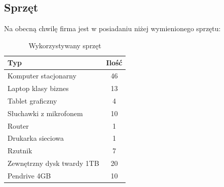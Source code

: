 \documentclass{article}
\begin{document}
        \subsection{Sprzęt}
            Na obecną chwilę firma jest w posiadaniu niżej wymienionego sprzętu:
            \begin{table}[H]
                \centering
                \begin{tabular}{ | l | c | }
                    \hline
                    \textbf{Typ} & \textbf{Ilość} \\
                    \hline
                    Komputer stacjonarny & 46 \\
                    \hline
                    Laptop klasy biznes & 13 \\
                    \hline
                    Tablet graficzny & 4 \\
                    \hline
                    Słuchawki z mikrofonem & 10 \\
                    \hline
                    Router & 1 \\
                    \hline
                    Drukarka sieciowa & 1 \\
                    \hline
                    Rzutnik & 7 \\
                    \hline
                    Zewnętrzny dysk twardy 1TB & 20 \\
                    \hline
                    Pendrive 4GB & 10 \\
                    \hline
                \end{tabular}
                \caption{Wykorzystywany sprzęt}
            \end{table}
\end{document}
